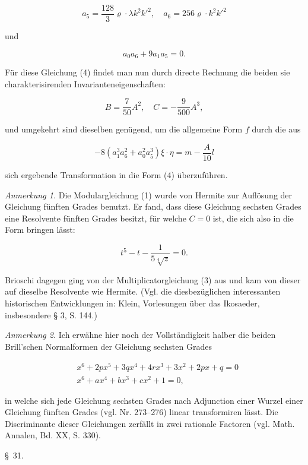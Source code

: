 \[
a_5 = \frac{128}{3}\varrho\cdot\lambda k^2k'^2, \quad a_6 = 256\varrho\cdot k^2k'^2
\]

und

\[
a_0a_6 + 9a_1a_5 = 0.
\]

Für diese Gleichung (4) findet man nun durch directe Rechnung die beiden sie charakterisirenden Invarianteneigenschaften:

\[
B = \frac{7}{50}A^2, \quad C = -\frac{9}{500}A^3,
\]

und umgekehrt sind dieselben genügend, um die allgemeine Form $f$ durch die aus

\[
-8(a_1^3a_6^2 + a_0^2a_5^3)\xi\cdot\eta = m - \frac{A}{10}l
\]

sich ergebende Transformation in die Form (4) überzuführen.

\textit{Anmerkung 1.} Die Modulargleichung (1) wurde von Hermite zur Auflösung der Gleichung fünften Grades benutzt. Er fand, dass diese Gleichung sechsten Grades eine Resolvente fünften Grades besitzt, für welche $C=0$ ist, die sich also in die Form bringen lässt:

\[
t^5 - t - \frac{1}{5\sqrt[4]{z}} = 0.
\]



Brioschi dagegen ging von der Multiplicatorgleichung (3) aus und kam von dieser auf dieselbe Resolvente wie Hermite. (Vgl. die diesbezüglichen interessanten historischen Entwicklungen in: Klein, \glqq Vorlesungen über das Ikosaeder\grqq{}, insbesondere § 3, S. 144.)

\textit{Anmerkung 2.} Ich erwähne hier noch der Vollständigkeit halber die beiden Brill'schen Normalformen der Gleichung sechsten Grades

\[
\begin{aligned}
&x^6 + 2px^5 + 3qx^4 + 4rx^3 + 3x^2 + 2px + q = 0\\
&x^6 + ax^4 + bx^3 + cx^2 + 1 = 0,
\end{aligned}
\]

in welche sich jede Gleichung sechsten Grades nach Adjunction einer Wurzel einer Gleichung fünften Grades (vgl. Nr. 273--276) linear transformiren lässt. Die Discriminante dieser Gleichungen zerfällt in zwei rationale Factoren (vgl. Math. Annalen, Bd. XX, S. 330).

\begin{center}
\S~31. 
\end{center}

